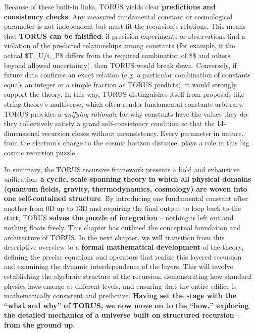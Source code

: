 \documentclass[
]{article}
\begin{document}
Because of these built-in links, TORUS yields clear \textbf{predictions
and consistency checks}. Any measured fundamental constant or
cosmological parameter is not independent but must fit the recursion's
relations. This means that \textbf{TORUS can be falsified}: if precision
experiments or observations find a violation of the predicted
relationships among constants (for example, if the actual \$T\_U/t\_P\$
differs from the required combination of \$\alpha\$ and others beyond allowed
uncertainty), then TORUS would break down\hspace{0pt}. Conversely, if
future data confirms an exact relation (e.g. a particular combination of
constants equals an integer or a simple fraction as TORUS predicts), it
would strongly support the theory. In this way, TORUS distinguishes
itself from proposals like string theory's multiverse, which often
render fundamental constants arbitrary. TORUS provides a \emph{unifying
rationale} for why constants have the values they do: they collectively
satisfy a grand self-consistency condition so that the 14-dimensional
recursion closes without inconsistency. Every parameter in nature, from
the electron's charge to the cosmic horizon distance, plays a role in
this big cosmic recursion puzzle.

In summary, the TORUS recursive framework presents a bold and exhaustive
unification: \textbf{a cyclic, scale-spanning theory in which all
physical domains (quantum fields, gravity, thermodynamics, cosmology)
are woven into one self-contained structure}. By introducing one
fundamental constant after another from 0D up to 13D and requiring the
final output to loop back to the start, TORUS \textbf{solves the puzzle
of integration} -- nothing is left out and nothing floats freely. This
chapter has outlined the conceptual foundation and architecture of
TORUS. In the next chapter, we will transition from this descriptive
overview to a \textbf{formal mathematical development} of the theory,
defining the precise equations and operators that realize this layered
recursion and examining the dynamic interdependence of the layers. This
will involve establishing the algebraic structure of the recursion,
demonstrating how standard physics laws emerge at different levels, and
ensuring that the entire edifice is mathematically consistent and
predictive. \textbf{Having set the stage with the ``what and why'' of
TORUS, we now move on to the ``how,'' exploring the detailed mechanics
of a universe built on structured recursion -- from the ground up.}
\end{document}
